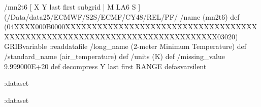 \begin{ingrid}
/mn2t6 { [ X Y last first subgrid | M LA6 S ] (/Data/data25/ECMWF/S2S/ECMF/CY48/REL/PF/%
/name (mn2t6) def
(04XXXX000B0000XXXXXXXXXXXXXXXXXXXXXXXXXXXXXXXXXXXXXXXXXXXXXXXXXXXXXXXXXXXXXXXXXXXXXXXXXXXX03020) GRIBvariable
:readdatafile
/long_name (2-meter Minimum Temperature) def
/standard_name (air_temperature) def
/units (K) def
/missing_value 9.999000E+20 def
decompress
Y last first RANGE
} defasvarsilent


:dataset


:dataset
\end{ingrid}
